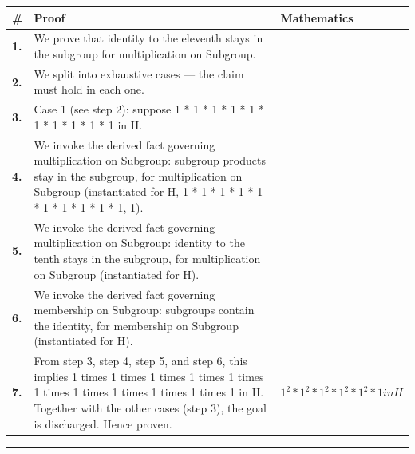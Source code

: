\documentclass[11pt]{article}
\theoremstyle{definition}
\begin{document}
\begin{tabular}{@{} >{\raggedright\arraybackslash}p{} >{\raggedright\arraybackslash}p{} >{\raggedleft\arraybackslash}p{} @{}}
\textbf{\#} & \textbf{Proof} & \textbf{Mathematics} \\
\midrule
\textbf{1.} & We prove that identity to the eleventh stays in the subgroup for multiplication on Subgroup. & \\[0.45em]
\textbf{2.} & We split into exhaustive cases — the claim must hold in each one. & \\[0.45em]
\textbf{3.} & Case 1 (see step 2): suppose 1 * 1 * 1 * 1 * 1 * 1 * 1 * 1 * 1 * 1 in H. & \\[0.45em]
\textbf{4.} & We invoke the derived fact governing multiplication on Subgroup: subgroup products stay in the subgroup, for multiplication on Subgroup (instantiated for H, 1 * 1 * 1 * 1 * 1 * 1 * 1 * 1 * 1 * 1, 1). & \\[0.45em]
\textbf{5.} & We invoke the derived fact governing multiplication on Subgroup: identity to the tenth stays in the subgroup, for multiplication on Subgroup (instantiated for H). & \\[0.45em]
\textbf{6.} & We invoke the derived fact governing membership on Subgroup: subgroups contain the identity, for membership on Subgroup (instantiated for H). & \\[0.45em]
\textbf{7.} & From step 3, step 4, step 5, and step 6, this implies 1 times 1 times 1 times 1 times 1 times 1 times 1 times 1 times 1 times 1 times 1 in H. Together with the other cases (step 3), the goal is discharged. Hence proven. & $\displaystyle 1^{2} * 1^{2} * 1^{2} * 1^{2} * 1^{2} * 1 in H$ \\[0.45em]
\bottomrule
\end{tabular}
\label{thm:Subgroup-multiplication-identity_to_the_eleventh_stays_in_the_subgroup}
\par\medskip\hrule
\end{document}
